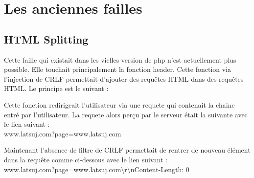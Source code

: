 \documentclass{article}
\begin{document}
\newpage
\section{Les anciennes failles}
\subsection{HTML Splitting}

Cette faille qui existait dans les vielles version de php n'est actuellement plus possible. Elle touchait principalement la fonction header. Cette fonction via l'injection de CRLF permettait d'ajouter des requêtes HTML dans des requêtes HTML. Le principe est le suivant :
\vspace{0.2cm}\\
\vspace{0.2cm}

Cette fonction redirigeait l'utilisateur via une requete qui contenait la chaine entré par l'utilisateur. La requete alors perçu par le serveur était la suivante avec le lien suivant :\\ 
www.latsuj.com?page=www.latsuj.com
\vspace{0.2cm}\\
\vspace{0.2cm}

Maintenant l'absence de filtre de CRLF permettait de rentrer de nouveau élément dans la requête comme ci-dessous avec le lien suivant :\\
www.latsuj.com?page=www.latsuj.com\textbackslash r\textbackslash nContent-Length: 0
\vspace{0.2cm}\\
\vspace{0.2cm}
\end{document}
